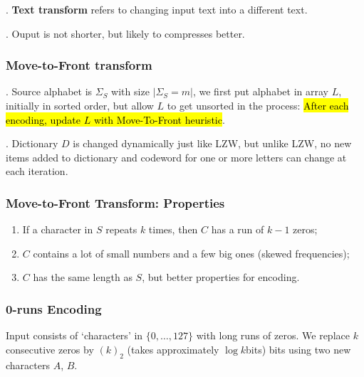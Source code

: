 \documentclass{article}
\begin{document}
\begin{deff}.
    \textbf{Text transform} refers to changing input text into a different text. \begin{comm}[].
        Ouput is not shorter, but likely to compresses better. 
    \end{comm}
\end{deff}

\subsubsection{Move-to-Front transform} 

\begin{algo}[].
    Source alphabet is $\Sigma_S$ with size $|\Sigma_S = m|$, we first put alphabet in array $L$, initially in sorted order, but allow $L$ to get unsorted in the process: \hl{After each encoding, update $L$ with Move-To-Front heuristic}. 
\end{algo}

\begin{discovery}[].
    Dictionary $D$ is changed dynamically just like LZW, but unlike LZW, no new items added to dictionary and codeword for one or more letters can change at each iteration. 
\end{discovery}

\subsubsection{Move-to-Front Transform: Properties} 

\begin{enumerate}
    \item If a character in $S$ repeats $k$ times, then $C$ has a run of $k - 1$ zeros; 
    \item $C$ contains a lot  of small numbers and a few big ones (skewed frequencies);  
    \item $C$ has the same length as $S$, but better properties for encoding.
\end{enumerate}

\subsubsection{0-runs Encoding} 

Input consists of `characters' in $\{ 0, \ldots, 127 \}$ with long runs of zeros. We replace $k$ consecutive zeros by $(k)_2$ (takes approximately $\log k $bits) bits using two new characters $A$, $B$. 
\end{document}
